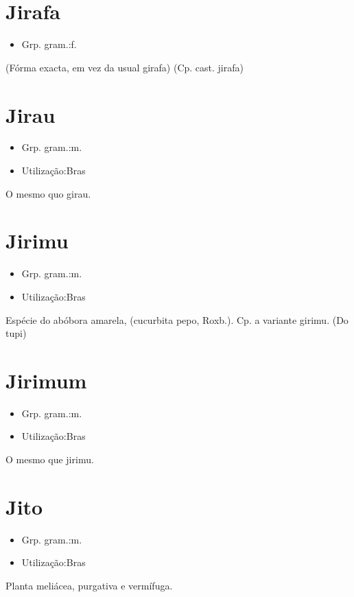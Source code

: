 \documentclass{article}
\begin{document}
\section{Jirafa}
\begin{itemize}
\item {Grp. gram.:f.}
\end{itemize}
(Fórma exacta, em vez da usual \textunderscore girafa\textunderscore )
(Cp. cast. \textunderscore jirafa\textunderscore )
\section{Jirau}
\begin{itemize}
\item {Grp. gram.:m.}
\end{itemize}
\begin{itemize}
\item {Utilização:Bras}
\end{itemize}
O mesmo quo \textunderscore girau\textunderscore .
\section{Jirimu}
\begin{itemize}
\item {Grp. gram.:m.}
\end{itemize}
\begin{itemize}
\item {Utilização:Bras}
\end{itemize}
Espécie do abóbora amarela, (\textunderscore cucurbita pepo\textunderscore , Roxb.). Cp. a variante \textunderscore girimu\textunderscore .
(Do tupi)
\section{Jirimum}
\begin{itemize}
\item {Grp. gram.:m.}
\end{itemize}
\begin{itemize}
\item {Utilização:Bras}
\end{itemize}
O mesmo que \textunderscore jirimu\textunderscore .
\section{Jito}
\begin{itemize}
\item {Grp. gram.:m.}
\end{itemize}
\begin{itemize}
\item {Utilização:Bras}
\end{itemize}
Planta meliácea, purgativa e vermífuga.
\end{document}

